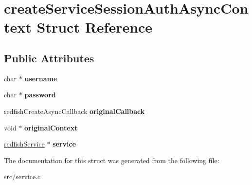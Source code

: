 \hypertarget{structcreateServiceSessionAuthAsyncContext}{}\section{create\+Service\+Session\+Auth\+Async\+Context Struct Reference}
\label{structcreateServiceSessionAuthAsyncContext}
\subsection*{Public Attributes}
\begin{DoxyCompactItemize}
\item 
\mbox{\label{structcreateServiceSessionAuthAsyncContext_a3ebf3aed7ba6e54e01ee1d7272a0d690}} 
char $\ast$ {\bfseries username}
\item 
\mbox{\label{structcreateServiceSessionAuthAsyncContext_ab12242cae077fa39d83762caba6f7d26}} 
char $\ast$ {\bfseries password}
\item 
\mbox{\label{structcreateServiceSessionAuthAsyncContext_a51947a6f4422b11102b2ab57d04a6c5f}} 
redfish\+Create\+Async\+Callback {\bfseries original\+Callback}
\item 
\mbox{\label{structcreateServiceSessionAuthAsyncContext_a0aec666591478b573ac8476673f206dc}} 
void $\ast$ {\bfseries original\+Context}
\item 
\mbox{\label{structcreateServiceSessionAuthAsyncContext_aeee12f46ae5b2d683e62d45365533692}} 
\hyperlink{redfishService_8h_a4c9115c0f0a21de971c0dfae06f26372}{redfish\+Service} $\ast$ {\bfseries service}
\end{DoxyCompactItemize}


The documentation for this struct was generated from the following file\+:\begin{DoxyCompactItemize}
\item 
src/service.\+c\end{DoxyCompactItemize}
